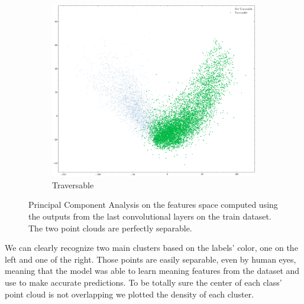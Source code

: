 \documentclass[../document.tex]{subfiles}
\begin{document}
\begin{figure} [htbp]
    \begin{subfigure}[b]{0.48\textwidth}
        \includegraphics[width=\linewidth]{../img/5/pca/pca-1.png}
        \caption{Traversable}
    \end{subfigure}
\caption{Principal Component Analysis on the features space computed using the outputs from the last convolutional layers on the train dataset. The two point clouds are perfectly separable.}
\label{fig : pca-train-set}
\end{figure}
We can clearly recognize two main clusters based on the labels' color, one on the left and one of the right. Those points are easily separable, even by human eyes, meaning that the model was able to learn meaning features from the dataset and use to make accurate predictions. To be totally sure the center of each class' point cloud is not overlapping we plotted the density of each cluster.
\end{document}

